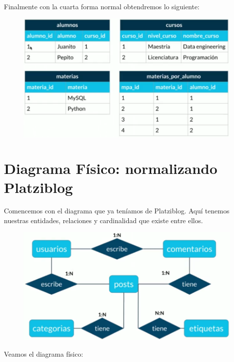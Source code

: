 \documentclass{article}
\begin{document}
Finalmente con la cuarta forma normal obtendremos lo siguiente:

\begin{figure}[h!]
    \centering
      \includegraphics[scale=0.45]{./Pictures/026_cuarta_normal.png}
\end{figure}


\section{Diagrama Físico: normalizando Platziblog}%
Comencemos con el diagrama que ya teníamos de Platziblog. Aquí tenemos nuestras
entidades, relaciones y cardinalidad que existe entre ellos.\\

\begin{figure}[h!]
    \centering
      \includegraphics[scale=0.45]{./Pictures/027_diagramaER.png}
\end{figure}

Veamos el diagrama físico:
\end{document}

